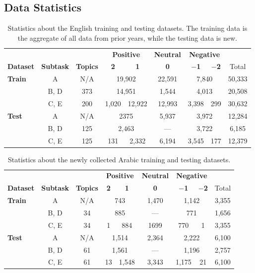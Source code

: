 \documentclass[11pt,a4paper]{article}
\begin{document}
\subsection{Data Statistics}

\begin{table} 
\centering
\begin{tabular}{|l|c|c|c|c|c|c|c|c|}
\hline
 &  &  &  \multicolumn{2}{c|}{\bf{Positive}} & \bf{Neutral}  & \multicolumn{2}{c|}{\bf{Negative}}  &  \\
\bf{Dataset} & \bf{Subtask} & \bf{Topics} & \bf{2} & \bf{1} & \bf{0} & \bf{$-$1} & \bf{$-$2} & Total \\
\hline
\bf{Train} & A & N/A & \multicolumn{2}{c|}{19,902} & 22,591 & \multicolumn{2}{c|}{7,840} & 50,333 \\
 & B, D & 373 & \multicolumn{2}{c|}{14,951} & 1,544 & \multicolumn{2}{c|}{4,013} & 20,508 \\
 & C, E & 200 & 1,020 & 12,922 & 12,993 & 3,398 & 299 & 30,632 \\
 \hline
\bf{Test} & A & N/A & \multicolumn{2}{c|}{2375}  & 5,937 & \multicolumn{2}{c|}{3,972} & 12,284 \\
 & B, D & 125 & \multicolumn{2}{c|}{2,463}  & ---  &  \multicolumn{2}{c|}{3,722} & 6,185 \\
 & C, E & 125 & 131 & 2,332 & 6,194 & 3,545 & 177 & 12,379  \\
 \hline
\end{tabular}
\caption{Statistics about the English training and testing datasets. The training data is the aggregate of all data from prior years, while the testing data is new.}
\label{T:English_Data}
\end{table}

\begin{table} 
\centering
\begin{tabular}{|l|c|c|c|c|c|c|c|c|}
\hline
 &  &  &  \multicolumn{2}{c|}{\bf{Positive}} & \bf{Neutral}  & \multicolumn{2}{c|}{\bf{Negative}}  &  \\
\bf{Dataset} & \bf{Subtask} & \bf{Topics} & \bf{2} & \bf{1} & \bf{0} & \bf{$-$1} & \bf{$-$2} & Total \\
\hline
\bf{Train} & A & N/A & \multicolumn{2}{c|}{743} & 1,470 & \multicolumn{2}{c|}{1,142} & 3,355 \\
 & B, D & 34 & \multicolumn{2}{c|}{885} & --- &  \multicolumn{2}{c|}{771} &  1,656 \\
 & C, E & 34 & 1 & 884 & 1699 & 770 &1  & 3,355  \\
 \hline
\bf{Test} & A & N/A & \multicolumn{2}{c|}{1,514}  & 2,364  & \multicolumn{2}{c|}{2,222} &  6,100 \\
 & B, D & 61  & \multicolumn{2}{c|}{1,561}  & ---  &  \multicolumn{2}{c|}{1,196} & 2,757  \\
 & C, E & 61 & 13 & 1,548 & 3,343  & 1,175 &  21 & 6,100 \\
 \hline
\end{tabular}
\caption{Statistics about the newly collected Arabic training and testing datasets.}
\label{T:Arabic_Data}
\end{table}
\end{document}
